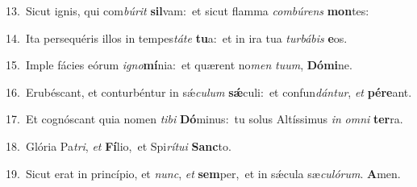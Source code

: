 {\numbfont\textcolor{\numbcolor}{13.}}~Sicut ignis, qui com\-\textit{bú}\-\textit{rit} \textbf{sil}\-vam:~\star et sicut flamma \textit{com}\-\textit{bú}\textit{rens} \textbf{mon}\-tes:\par
{\numbfont\textcolor{\numbcolor}{14.}}~Ita persequéris illos in tempes\-\textit{tá}\-\textit{te} \textbf{tu}\-a:~\star et in ira tua \textit{tur}\-\textit{bá}\textit{bis} \textbf{e}\-os.\par
{\numbfont\textcolor{\numbcolor}{15.}}~Imple fácies eórum \textit{i}\-\textit{gno}\textbf{mí}nia:~\star et quærent no\textit{men} \textit{tu}\-\textit{um}, \textbf{Dó}\-\textbf{mi}ne.\par
{\numbfont\textcolor{\numbcolor}{16.}}~Erubéscant, et conturbéntur in sǽ\-\textit{cu}\-\textit{lum} \textbf{sǽ}\-culi:~\star et confun\-\textit{dán}\-\textit{tur}, \textit{et} \textbf{pér}\-\textbf{e}ant.\par
{\numbfont\textcolor{\numbcolor}{17.}}~Et cognóscant quia nomen \textit{ti}\-\textit{bi} \textbf{Dó}\-minus:~\star tu solus Altíssimus \textit{in} \textit{om}\-\textit{ni} \textbf{ter}\-ra.\par
{\numbfont\textcolor{\numbcolor}{18.}}~Glória Pa\-\textit{tri}\-, \textit{et} \textbf{Fí}\-lio,~\star et Spi\-\textit{rí}\-\textit{tu}\textit{i} \textbf{Sanc}\-to.\par
{\numbfont\textcolor{\numbcolor}{19.}}~Sicut erat in princípio, et \textit{nunc}\-, \textit{et} \textbf{sem}\-per,~\star et in sǽcula sæ\-\textit{cu}\-\textit{ló}\textit{rum}. \textbf{A}\-men.\par
